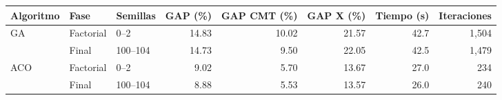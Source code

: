 \begin{tabular}{lllrrrrr}
\toprule
Algoritmo & Fase & Semillas & GAP (\%) & GAP CMT (\%) & GAP X (\%) & Tiempo (s) & Iteraciones \\
\midrule
GA & Factorial & 0--2 & 14.83 & 10.02 & 21.57 & 42.7 & 1,504 \\
 & Final & 100--104 & 14.73 & 9.50 & 22.05 & 42.5 & 1,479 \\
ACO & Factorial & 0--2 & 9.02 & 5.70 & 13.67 & 27.0 & 234 \\
 & Final & 100--104 & 8.88 & 5.53 & 13.57 & 26.0 & 240 \\
\bottomrule
\end{tabular}
